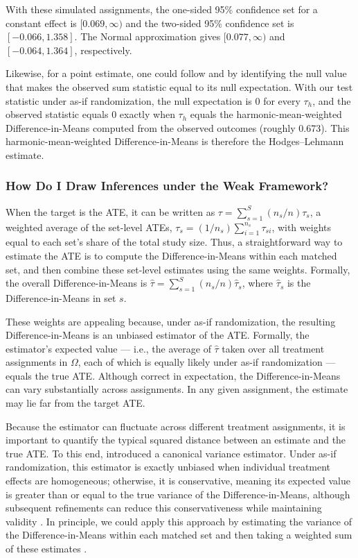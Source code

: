 \documentclass[twoside,11pt]{article}
\begin{document}
With these simulated assignments, the one-sided 95\% confidence set for
a constant effect is \([0.069, \infty)\) and the two-sided 95\% confidence
set is \([-0.066, 1.358]\). The Normal approximation gives
\([0.077, \infty)\) and \([-0.064, 1.364]\), respectively.



Likewise, for a point estimate, one could follow
\citet{hodgeslehmann1963} and \citet{rosenbaum1993} by identifying the
null value that makes the observed sum statistic equal to its null
expectation. With our test statistic under as-if randomization, the null
expectation is \(0\) for every \(\tau_h\), and the observed statistic equals
\(0\) exactly when \(\tau_h\) equals the harmonic-mean-weighted
Difference-in-Means computed from the observed outcomes (roughly 0.673).
This harmonic-mean-weighted Difference-in-Means is therefore the
Hodges--Lehmann estimate.

\subsubsection{How Do I Draw Inferences under the Weak
Framework?}\label{how-do-i-draw-inferences-under-the-weak-framework}

When the target is the ATE, it can be written as
\(\tau = \sum_{s = 1}^S (n_s / n)\tau_s\), a weighted average of the
set-level ATEs, \(\tau_s = (1/n_s)\sum_{i=1}^{n_s}\tau_{si}\), with weights equal to each set's share of the total study
size. Thus, a straightforward way to estimate the ATE is to compute the
Difference-in-Means within each matched set, and then combine these
set-level estimates using the same weights. Formally, the overall
Difference-in-Means is
\(\hat{\tau} = \sum_{s=1}^S (n_s / n) \hat{\tau}_s\), where
\(\hat{\tau}_s\) is the Difference-in-Means in set \(s\).

These weights are appealing because, under as-if randomization, the
resulting Difference-in-Means is an unbiased estimator of the ATE.
Formally, the estimator's expected value --- i.e., the average of
\(\hat{\tau}\) taken over all treatment assignments in \(\Omega\), each of
which is equally likely under as-if randomization --- equals the true
ATE. Although correct in expectation, the
Difference-in-Means can vary substantially across assignments. In any
given assignment, the estimate may lie far from the target ATE.

Because the estimator can fluctuate across different treatment
assignments, it is important to quantify the typical squared distance
between an estimate and the true ATE. To this end, \citet{neyman1923}
introduced a canonical variance estimator. Under as-if randomization,
this estimator is exactly unbiased when individual treatment effects are
homogeneous; otherwise, it is conservative, meaning its expected value
is greater than or equal to the true variance of the
Difference-in-Means, although subsequent refinements can reduce this
conservativeness while maintaining validity
\citep[see][]{robins1988, aronowetal2014, harshawetal2024}. In
principle, we could apply this approach by estimating the variance of
the Difference-in-Means within each matched set and then taking a
weighted sum of these estimates \citep[see, e.g.,][]{miratrixetal2013}.
\end{document}
